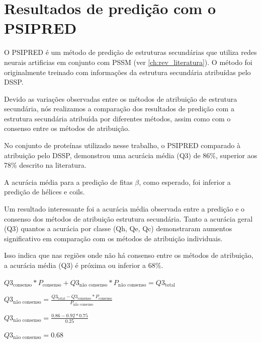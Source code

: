 \section{Resultados de predição com o PSIPRED}

O PSIPRED é um método de predição de estruturas secundárias que utiliza redes neurais artificias em conjunto com PSSM \citep{10.1006/jmbi.1999.3091} (ver \ref{ch:rev_literatura}). O método foi originalmente treinado com informações da estrutura secundária atribuídas pelo DSSP. 

Devido as variações observadas entre os métodos de atribuição de estrutura secundária, nós realizamos a comparação dos resultados de predição com a estrutura secundária atribuída por diferentes métodos, assim como com o consenso entre os métodos de atribuição.

No conjunto de proteínas utilizado nesse trabalho, o PSIPRED comparado à atribuição pelo DSSP, demonstrou uma acurácia média (Q3) de 86\%, superior aos 78\% descrito na literatura. 

A acurácia média para a predição de fitas $\beta$, como esperado, foi inferior a predição de hélices e coils.

Um resultado interessante foi a acurácia média observada entre a predição e o consenso dos métodos de atribuição estrutura secundária. Tanto a acurácia geral (Q3) quantos a acurácia por classe (Qh, Qe, Qc) demonstraram aumentos significativo em comparação com os métodos de atribuição individuais. 

Isso indica que nas regiões onde não há consenso entre os métodos de atribuição, a acurácia média (Q3) é próxima ou inferior a 68\%.

$Q3_\text{consenso}*P_\text{consenso} + Q3_\text{não consenso}*P_\text{não consenso} = Q3_\text{total}$

$Q3_\text{não consenso} = \frac{Q3_\text{total} - Q3_\text{consenso}*P_\text{consenso}}{P_\text{não consenso}}$

$Q3_\text{não consenso} = \frac{0.86 - 0.92*0.75}{0.25}$

$Q3_\text{não consenso} = 0.68$


